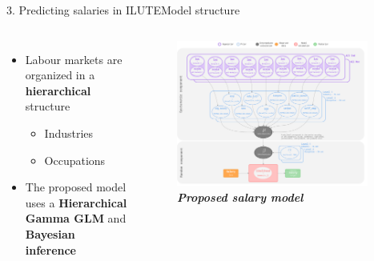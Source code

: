 \documentclass[aspectratio=169]{beamer}
\begin{document}
\begin{frame}{3. Predicting salaries in ILUTE}{Model structure}
    \vspace*{-35pt}
    \begin{columns}
            \begin{itemize}
                \setlength{\itemsep}{10pt} %
                \item \fontsize{9pt}{9pt}\selectfont Labour markets are organized in a \textbf{hierarchical} structure
                \begin{itemize}
                    \item \fontsize{9pt}{9pt}\selectfont Industries
                    \item \fontsize{9pt}{9pt}\selectfont Occupations
                \end{itemize}
                \item \fontsize{9pt}{9pt}\selectfont The proposed model uses a \textbf{Hierarchical Gamma GLM} and \textbf{Bayesian inference}
            \end{itemize}
            \begin{figure}
                \centering
                \includegraphics[width=0.95\textwidth]{./images/hierarchical_graph.png}
                \captionsetup{labelformat=empty}
                \setlength{\abovecaptionskip}{-2pt} %
                \caption{\fontsize{8pt}{8pt}\selectfont \textbf{\textit{Proposed salary model}}}
            \end{figure}
    \end{columns}
\end{frame}
\end{document}
